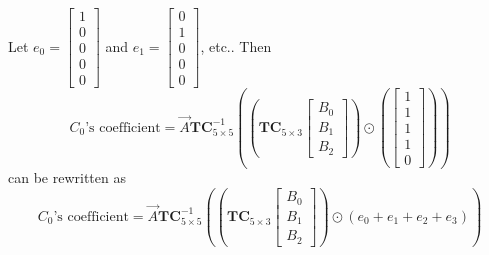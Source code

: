 \documentclass[
11pt,notheorems,hyperref={pdfauthor=whatever}
]{beamer}
\begin{document}
\begin{frame}
    Let $e_{0} = \begin{bmatrix}1\\0\\0\\0\\0\end{bmatrix}$ and $e_{1} = \begin{bmatrix}0\\1\\0\\0\\0\end{bmatrix}$, etc..
    Then
    \[
        C_{0}\text{'s coefficient} = \vec{A} \mathbf{TC}_{5\times 5}^{-1} \left(\left(\mathbf{TC}_{5\times 3}\begin{bmatrix}B_{0}\\B_{1}\\B_{2}\end{bmatrix}\right)\odot \left( \begin{bmatrix}1\\1\\1\\1\\0\end{bmatrix} \right)\right)
    \]
    can be rewritten as
    \[
        C_{0}\text{'s coefficient} = \vec{A} \mathbf{TC}_{5\times 5}^{-1} 
        \left(\left(\mathbf{TC}_{5\times 3}\begin{bmatrix}B_{0}\\B_{1}\\B_{2}\end{bmatrix}\right)\odot (e_{0}+e_{1}+e_{2}+e_{3}) \right)
    \]
\end{frame}
\end{document}
